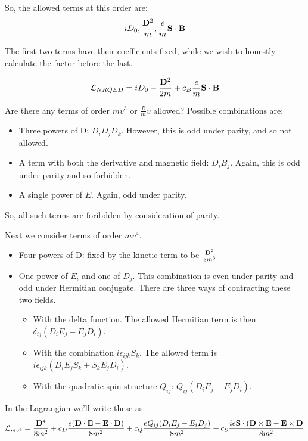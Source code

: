 So, the allowed terms at this order are:
\[
	iD_0, \frac{\mathbf{D}^2}{m}, \frac{e}{m} \mathbf{S} \cdot \mathbf{B}
\]

The first two terms have their coefficients fixed, while we wish to honestly calculate the factor before the last.

\[
	\mathcal{L}_{NRQED} = iD_0 -  \frac{\mathbf{D}^2}{2m}  +  c_B \frac{e}{m} \mathbf{S} \cdot \mathbf{B}
\]

Are there any terms of order $mv^3$ or $\frac{B}{m}v$ allowed?  Possible combinations are:
\begin{itemize}
  \item Three powers of D: $D_i D_j D_k$.  However, this is odd under parity, and so not allowed.  
  \item A term with both the derivative and magnetic field: $D_i B_j$.  Again, this is odd under parity and so forbidden.
  \item A single power of $E$.  Again, odd under parity.
\end{itemize}
So, all such terms are foribdden by consideration of parity.

Next we consider terms of order $mv^4$.
\begin{itemize}
  \item Four powers of D: fixed by the kinetic term to be $\frac{\mathbf{D}^2}{8m^3}$
  \item One power of $E_i$ and one of $D_j$.  This combination is even under parity and odd under Hermitian conjugate.  There are three ways of contracting these two fields.
  \begin{itemize}
  		\item	With the delta function.  The allowed Hermitian term is then $\delta_{ij}(D_i E_j - E_j D_i)$.
  		\item	With the combination $i\epsilon_{ijk} S_k$.  The allowed term is $i\epsilon_{ijk}(D_i E_j S_k + S_k E_j D_i)$.
  		\item 	With the quadratic spin structure $Q_{ij}$: $ Q_{ij} ( D_i E_j - E_j D_i)$.
  \end{itemize}
\end{itemize}

In the Lagrangian we'll write these as:
\[
	\mathcal{L}_{mv^4} = 
		\frac{\mathbf{D}^4}{8m^2}
		+ c_D \frac{e (\mathbf{D} \cdot \mathbf{E} - \mathbf{E} \cdot \mathbf{D})}{8m^2} 
		+ c_Q \frac{eQ_{ij}(D_i E_j - E_i D_j)}{8m^2}
		+ c_S \frac{ i e \mathbf{S} \cdot(\mathbf{D} \times \mathbf{E} - \mathbf{E} \times \mathbf{D}}{8m^2}
\]


